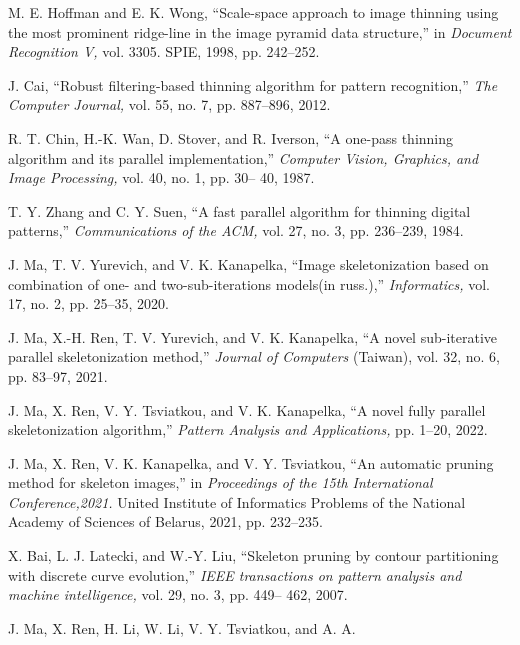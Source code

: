 \documentclass[twocolumn]{article}
\begin{document}
\begin{itemize}
{  \renewcommand{\labelitemi}{[20]}
  \item M. E. Hoffman and E. K. Wong, “Scale-space approach to image thinning using the most prominent ridge-line in the image pyramid data structure,” in \textit{Document Recognition V,} vol. 3305. SPIE, 1998, pp. 242–252. 
  \renewcommand{\labelitemi}{[21]}
  \item J. Cai, “Robust filtering-based thinning algorithm for pattern recognition,” \textit{The Computer Journal,} vol. 55, no. 7, pp. 887–896, 2012. 
  \renewcommand{\labelitemi}{[22]}
  \item R. T. Chin, H.-K. Wan, D. Stover, and R. Iverson, “A one-pass thinning algorithm and its parallel implementation,” \textit{Computer Vision, Graphics, and Image Processing,} vol. 40, no. 1, pp. 30– 40, 1987. 
  \renewcommand{\labelitemi}{[23]}
  \item T. Y. Zhang and C. Y. Suen, “A fast parallel algorithm for thinning digital patterns,” \textit{Communications of the ACM,} vol. 27, no. 3, pp. 236–239, 1984. 
  \renewcommand{\labelitemi}{[24]}
  \item J. Ma, T. V. Yurevich, and V. K. Kanapelka, “Image skeletonization based on combination of one- and two-sub-iterations models(in russ.),” \textit{Informatics,} vol. 17, no. 2, pp. 25–35, 2020.} 
  \renewcommand{\labelitemi}{[25]}
  \item J. Ma, X.-H. Ren, T. V. Yurevich, and V. K. Kanapelka, “A
novel sub-iterative parallel skeletonization method,” \textit{Journal of Computers} (Taiwan), vol. 32, no. 6, pp. 83–97, 2021.
\renewcommand{\labelitemi}{[26]}
  \item J. Ma, X. Ren, V. Y. Tsviatkou, and V. K. Kanapelka, “A novel
fully parallel skeletonization algorithm,” \textit{Pattern Analysis and
Applications,} pp. 1–20, 2022.
\renewcommand{\labelitemi}{[27]}
  \item J. Ma, X. Ren, V. K. Kanapelka, and V. Y. Tsviatkou, “An
automatic pruning method for skeleton images,” in \textit{Proceedings
of the 15th International Conference,2021.} United Institute of
Informatics Problems of the National Academy of Sciences of
Belarus, 2021, pp. 232–235.
\renewcommand{\labelitemi}{[28]}
  \item X. Bai, L. J. Latecki, and W.-Y. Liu, “Skeleton pruning by contour
partitioning with discrete curve evolution,” \textit{IEEE transactions on
pattern analysis and machine intelligence,} vol. 29, no. 3, pp. 449–
462, 2007.
\renewcommand{\labelitemi}{[29]}
  \item J. Ma, X. Ren, H. Li, W. Li, V. Y. Tsviatkou, and A. A.

\end{itemize}
\end{document}
